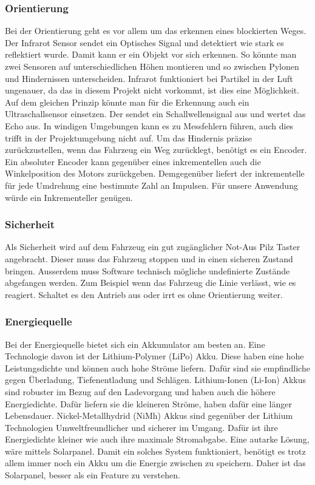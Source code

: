 \subsubsection{Orientierung}
Bei der Orientierung geht es vor allem um das erkennen eines blockierten Weges. Der Infrarot Sensor sendet ein Optisches Signal und detektiert wie stark es reflektiert wurde. Damit kann er ein Objekt vor sich erkennen. So könnte man zwei Sensoren auf unterschiedlichen Höhen montieren und so zwischen Pylonen und Hindernissen unterscheiden. Infrarot funktioniert bei Partikel in der Luft ungenauer, da das in diesem Projekt nicht vorkommt, ist dies eine Möglichkeit. Auf dem gleichen Prinzip könnte man für die Erkennung auch ein Ultraschallsensor einsetzen. Der sendet ein Schallwellensignal aus und wertet das Echo aus. In windigen Umgebungen kann es zu Messfehlern führen, auch dies trifft in der Projektumgebung nicht auf. Um das Hindernis präzise zurückzustellen, wenn das Fahrzeug ein Weg zurücklegt, benötigt es ein Encoder. Ein absoluter Encoder kann gegenüber eines inkrementellen auch die Winkelposition des Motors zurückgeben. Demgegenüber liefert der inkrementelle für jede Umdrehung eine bestimmte Zahl an Impulsen. Für unsere Anwendung würde ein Inkrementeller genügen. 

\subsubsection{Sicherheit}
Als Sicherheit wird auf dem Fahrzeug ein gut zugänglicher Not-Aus Pilz Taster angebracht. Dieser muss das Fahrzeug stoppen und in einen sicheren Zustand bringen. Ausserdem muss Software technisch mögliche undefinierte Zustände abgefangen werden. Zum Beispiel wenn das Fahrzeug die Linie verlässt, wie es reagiert. Schaltet es den Antrieb aus oder irrt es ohne Orientierung weiter.

\subsubsection{Energiequelle}
Bei der Energiequelle bietet sich ein Akkumulator am besten an. Eine Technologie davon ist der Lithium-Polymer (LiPo) Akku. Diese haben eine hohe Leistungsdichte und können auch hohe Ströme liefern. Dafür sind sie empfindliche gegen Überladung, Tiefenentladung und Schlägen. Lithium-Ionen (Li-Ion) Akkus sind robuster im Bezug auf den Ladevorgang und haben auch die höhere Energiedichte. Dafür liefern sie die kleineren Ströme, haben dafür eine länger Lebensdauer. Nickel-Metallhydrid (NiMh) Akkus sind gegenüber der Lithium Technologien Umweltfreundlicher und sicherer im Umgang. Dafür ist ihre Energiedichte kleiner wie auch ihre maximale Stromabgabe. Eine autarke Lösung, wäre mittels Solarpanel. Damit ein solches System funktioniert, benötigt es trotz allem immer noch ein Akku um die Energie zwischen zu speichern. Daher ist das Solarpanel, besser als ein Feature zu verstehen.

